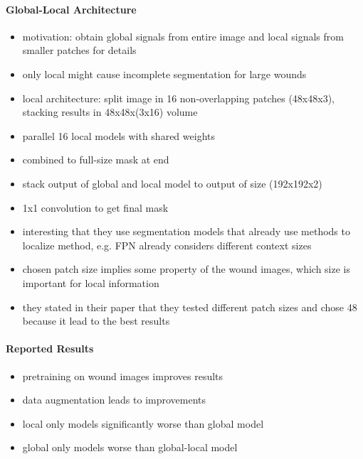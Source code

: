 \paragraph{Global-Local Architecture}

\begin{itemize}
	\item motivation: obtain global signals from entire image and local signals from smaller patches for details
	\item only local might cause incomplete segmentation for large wounds
	\item local architecture: split image in 16 non-overlapping patches (48x48x3), stacking results in 48x48x(3x16) volume
	\item parallel 16 local models with shared weights
	\item combined to full-size mask at end
	\item stack output of global and local model to output of size (192x192x2)
	\item 1x1 convolution to get final mask
\end{itemize}

\begin{itemize}
	\item interesting that they use segmentation models that already use methods to localize method, e.g. FPN already considers different context sizes
	\item chosen patch size implies some property of the wound images, which size is important for local information
	\item they stated in their paper that they tested different patch sizes and chose 48 because it lead to the best results
\end{itemize}


\paragraph{Reported Results}

\begin{itemize}
	\item pretraining on wound images improves results
	\item data augmentation leads to improvements
	\item local only models significantly worse than global model
	\item global only models worse than global-local model
\end{itemize}



